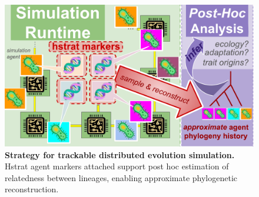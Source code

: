 \begin{figure}
  \vspace{2ex}
    \centering
  \includegraphics[width=0.8\linewidth]{img/runtime-posthoc-schematic}
  \vspace{-1.5ex}
    \caption{\textbf{Strategy for trackable distributed evolution simulation.}
    \footnotesize %
    Hstrat agent markers attached support post hoc estimation of relatedness between lineages, enabling approximate phylogenetic reconstruction.
    }
    \label{fig:runtime-posthoc-schematic}
\vspace{-0.2in}
\end{figure}

